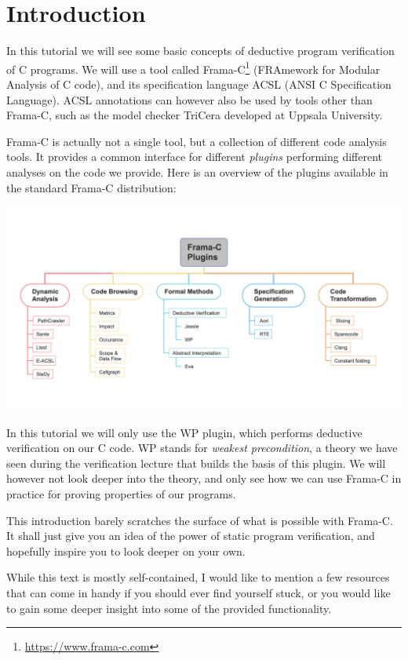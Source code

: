 \chapter{Introduction}

In this tutorial we will see some basic concepts of deductive program verification of C programs. We will use a tool called Frama-C\footnote{\url{https://www.frama-c.com}} (FRAmework for Modular Analysis of C code), and its specification language ACSL (ANSI C Specification Language). ACSL annotations can however also be used by tools other than Frama-C, such as the model checker TriCera \cite{esen2022tricera} developed at Uppsala University. 

Frama-C is actually not a single tool, but a collection of different code analysis tools. It provides a common interface for different \emph{plugins} performing different analyses on the code we provide. Here is an overview of the plugins available in the standard Frama-C distribution:

\begin{center}
    \includegraphics[width=\textwidth]{images/frama_c_plugins.png}
\end{center}

In this tutorial we will only use the WP plugin, which performs deductive verification on our C code. WP stands for \emph{weakest precondition}, a theory we have seen during the verification lecture that builds the basis of this plugin. We will however not look deeper into the theory, and only see how we can use Frama-C in practice for proving properties of our programs. 

This introduction barely scratches the surface of what is possible with Frama-C. It shall just give you an idea of the power of static program verification, and hopefully inspire you to look deeper on your own. 

While this text is mostly self-contained, I would like to mention a few resources that can come in handy if you should ever find yourself stuck, or you would like to gain some deeper insight into some of the provided functionality. 


